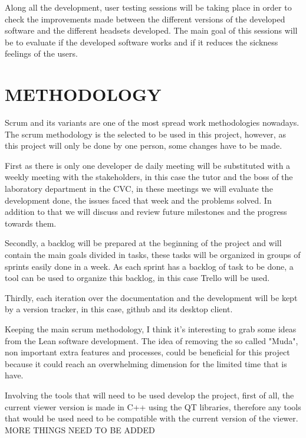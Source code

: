 \documentclass[10pt,a4paper,twocolumn,twoside]{article}
\begin{document}
Along all the development, user testing sessions will be taking place in order to check the improvements made between the different versions of the developed software and the different headsets developed. The main goal of this sessions will be to evaluate if the developed software works and if it reduces the sickness feelings of the users.

\section{METHODOLOGY}
Scrum and its variants are one of the most spread work methodologies nowadays.
The scrum methodology is the selected to be used in this project, however, as this project will only be done by one person, some changes have to be made. 

First as there is only one developer de daily meeting will be substituted with a weekly meeting with the stakeholders, in this case the tutor and the boss of the laboratory department in the CVC, in these meetings we will evaluate the development done, the issues faced that week and the problems solved. In addition to that we will discuss and review future milestones and the progress towards them.

Secondly, a backlog will be prepared at the beginning of the project and will contain the main goals divided in tasks, these tasks will be organized in groups of sprints easily done in a week. As each sprint has a backlog of task to be done, a tool can be used to organize this backlog, in this case Trello\cite{trello} will be used.

Thirdly, each iteration over the documentation and the development will be kept by a version tracker, in this case, github\cite{github} and its desktop client\cite{githubDesktop}. 

Keeping the main scrum methodology, I think it's interesting to grab some ideas from the Lean software development\cite{leanMethod}. The idea of removing the so called "Muda", non important extra features and processes, could be beneficial for this project because it could reach an overwhelming dimension for the limited time that is have.


Involving the tools that will need to be used develop the project, first of all, the current viewer version is made in C++ using the QT libraries\cite{qt}, therefore any tools that would be used need to be compatible with the current version of the viewer. MORE THINGS NEED TO BE ADDED
\end{document}

